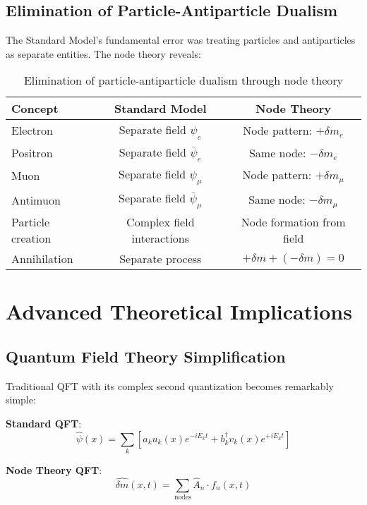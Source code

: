 \documentclass[12pt,a4paper]{article}
\newcommand{\deltam}{\delta m}
\theoremstyle{definition}
\theoremstyle{remark}
\begin{document}
	\subsection{Elimination of Particle-Antiparticle Dualism}
	
	The Standard Model's fundamental error was treating particles and antiparticles as separate entities. The node theory reveals:
	
	\begin{table}[htbp]
		\centering
		\begin{tabular}{lcc}
			\toprule
			\textbf{Concept} & \textbf{Standard Model} & \textbf{Node Theory} \\
			\midrule
			Electron & Separate field $\psi_e$ & Node pattern: $+\deltam_e$ \\
			Positron & Separate field $\bar{\psi}_e$ & Same node: $-\deltam_e$ \\
			Muon & Separate field $\psi_{\mu}$ & Node pattern: $+\deltam_{\mu}$ \\
			Antimuon & Separate field $\bar{\psi}_{\mu}$ & Same node: $-\deltam_{\mu}$ \\
			Particle creation & Complex field interactions & Node formation from field \\
			Annihilation & Separate process & $+\deltam + (-\deltam) = 0$ \\
			\bottomrule
		\end{tabular}
		\caption{Elimination of particle-antiparticle dualism through node theory}
		\label{tab:node_theory_comparison}
	\end{table}
	
	\section{Advanced Theoretical Implications}
	
	\subsection{Quantum Field Theory Simplification}
	
	Traditional QFT with its complex second quantization becomes remarkably simple:
	
	\textbf{Standard QFT}:
	\begin{equation}
		\hat{\psi}(x) = \sum_k \left[ a_k u_k(x) e^{-iE_k t} + b_k^\dagger v_k(x) e^{+iE_k t} \right]
	\end{equation}
	
	\textbf{Node Theory QFT}:
	\begin{equation}
		\hat{\deltam}(x,t) = \sum_{\text{nodes}} \hat{A}_n \cdot f_n(x,t)
	\end{equation}
	
\end{document}
